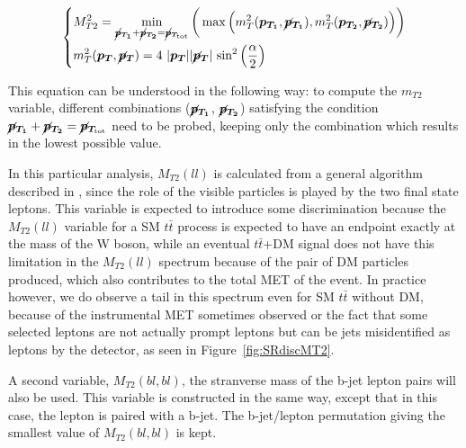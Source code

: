 \documentclass[a4paper, 10pt, openright]{report}
\begin{document}
\begin{equation}
\label{eq:mt2}
\begin{dcases}
M_{T2}^2 = \min_{\bm{\cancel{p}_{T_{1}}} + \bm{\cancel{p}_{T_{2}}} = \bm{\cancel{p}_{T_{\text{tot}}}}} \bigg (\max \Big (m_T^2(\bm{p_{T_1}}, \bm{\cancel{p}_{T_{1}}}), m_T^2(\bm{p_{T_2}}, \bm{\cancel{p}_{T_{2}}}) \Big ) \bigg ) \\
m_T^2(\bm{p_{T}}, \bm{\cancel{p}_{T}}) = 4 \text{ } |\bm{p_{T}}| |\bm{\cancel{p}_{T}}| \text{ sin}^2 \left (\frac{\alpha}{2} \right ) 
\end{dcases}
\end{equation}

This equation can be understood in the following way: to compute the $m_{T2}$ variable, different combinations ($\bm{\cancel{p}_{T_{1}}}$, $\bm{\cancel{p}_{T_{2}}}$) satisfying the condition $\bm{\cancel{p}_{T_{1}}} + \bm{\cancel{p}_{T_{2}}} = \bm{\cancel{p}_{T_{\text{tot}}}}$ need to be probed, keeping only the combination which results in the lowest possible value.

In this particular analysis, $M_{T2}(ll)$ is calculated from a general algorithm described in \cite{MT2Calc}, since the role of the visible particles is played by the two final state leptons. This variable is expected to introduce some discrimination because the $M_{T2}(ll)$ variable for a \ac{SM} $t \bar t$ process is expected to have an endpoint exactly at the mass of the W boson, while an eventual $t \bar t$+DM signal does not have this limitation in the $M_{T2}(ll)$ spectrum because of the pair of \ac{DM} particles produced, which also contributes to the total \ac{MET} of the event. In practice however, we do observe a tail in this spectrum even for \ac{SM} $t \bar t$ without \ac{DM}, because of the instrumental \ac{MET} sometimes observed or the fact that some selected leptons are not actually prompt leptons but can be jets misidentified as leptons by the detector, as seen in Figure~\ref{fig:SRdiscMT2}.

A second variable, $M_{T2}(bl, bl)$, the stranverse mass of the b-jet lepton pairs will also be used. This variable is constructed in the same way, except that in this case, the lepton is paired with a b-jet. The b-jet/lepton permutation giving the smallest value of $M_{T2}(bl, bl)$ is kept.
\end{document}

